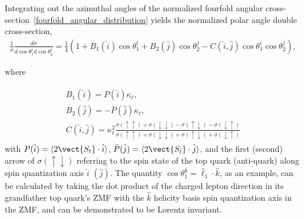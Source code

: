 Integrating out the azimuthal angles of the normalized fourfold angular cross-section~\ref{fourfold_angular_distribution} yields the normalized polar angle double cross-section,
\begin{align}
\frac{1}{\sigma} \frac{d \sigma}{d \cos \theta_1^i d \cos \theta_2^j}=\frac{1}{4}\left(1+B_1(\hat{i}) \cos \theta_1^i+B_2(\hat{j}) \cos \theta_2^j-C(\hat{i},\hat{j}) \cos \theta_1^i \cos \theta_2^j\right),
\label{double_angular_distribution}
\end{align}
\begin{center}
where 
\end{center}
\begin{align}
\begin{array}{c}
B_1(\hat{i}) = P(\hat{i})\kappa_\ell,\\
B_2(\hat{j}) = -\bar{P}(\hat{j})\kappa_\ell,\\
C(\hat{i}, \hat{j})=\kappa_{\ell}^2 \frac{\sigma(\uparrow \uparrow)+\sigma(\downarrow \downarrow)-\sigma(\uparrow \downarrow)-\sigma(\downarrow \uparrow)}{\sigma(\uparrow \uparrow)+\sigma(\downarrow \downarrow)+\sigma(\uparrow \downarrow)+\sigma(\downarrow \uparrow)}
\end{array}
\label{ttbar_squared_matrix_element}
\end{align}
with $P(\hat{i}) = \langle 2 \vect{S_t} \cdot \hat{i} \rangle$, $\bar{P}(\hat{j}) = \langle 2 \vect{S_{\bar{t}}} \cdot \hat{j} \rangle$, and the first (second) arrow of $\sigma(\uparrow \downarrow)$ referring to the spin state of the top quark (anti-quark) along spin quantization axis $\hat{i}$ $(\hat{j})$.
The quantity $\cos \theta_1^k = \hat{\ell}_1 \cdot \hat{k}$, as an example, can be calculated by taking the dot product of the charged lepton direction in its grandfather top quark's ZMF with the $\hat{k}$ helicity basis spin quantization axis in the \ttbar ZMF, and can be demonstrated to be Lorentz invariant.

